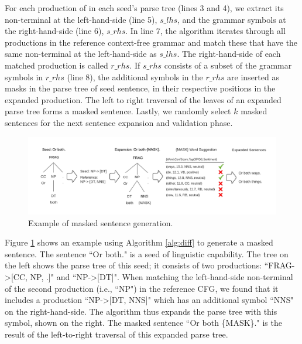 


For each production of in each seed's parse tree (lines 3 and 4), we
extract its non-terminal at the left-hand-side (line 5), $s\_lhs$, and
the grammar symbols at the right-hand-side (line 6), $s\_rhs$. In line
7, the algorithm iterates through all productions in the reference
context-free grammar and match these that have the same non-terminal
at the left-hand-side as $s\_lhs$.  The right-hand-side of each
matched production is called $r\_rhs$.  If $s\_rhs$ consists of a
subset of the grammar symbols in $r\_rhs$ (line 8), the additional
symbols in the $r\_rhs$ are inserted as masks in the parse tree of
seed sentence, in their respective positions in the expanded
production.  The left to right traversal of the leaves of an expanded
parse tree forms a masked sentence.  Lastly, we randomly select $k$
masked sentences for the next sentence expansion and validation phase.

\begin{figure}[t]
  \centering
  \includegraphics[scale=0.7]{figs/running_example.pdf}
  \caption{Example of masked sentence generation. }
\label{fig:ExpEx}
\end{figure}

Figure \ref{fig:ExpEx} shows an example using Algorithm \ref{alg:diff}
to generate a masked sentence. The sentence ``Or both." is a seed of
 linguistic capability.    The tree on
the left shows the parse tree of this seed; it consists of two
productions: ``FRAG->[CC, NP, .]" and ``NP->[DT]".  When matching the
left-hand-side non-terminal of the second production (i.e., ``NP") in
the reference CFG, we found that it includes a production ``NP->[DT,
  NNS]" which has an additional symbol ``NNS" on the right-hand-side.
The algorithm thus expands the parse tree with this symbol, shown on
the right.  The masked sentence ``Or both \{MASK\}." is the result of
the left-to-right traversal of this expanded parse tree.

